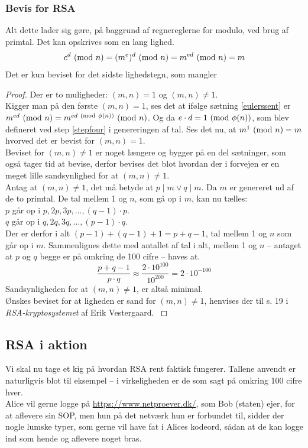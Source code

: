 \subsubsection{Bevis for RSA}
Alt dette lader sig gøre, på baggrund af regnereglerne for modulo, ved brug af primtal.
Det kan opskrives som en lang lighed.
\[c^d \ (\mathrm{mod}\ n) = (m^e)^d \ (\mathrm{mod}\ n) = m^{ed} \ (\mathrm{mod}\ n) = m\]
Det er kun beviset for det sidste lighedstegn, som mangler
\begin{proof}
        Der er to muligheder: \((m, n) = 1\) og \((m, n) \neq 1\).\\
        Kigger man på den første \((m, n) = 1\), ses det at ifølge sætning \ref{eulerssent} er \(m^{ed} \ (\mathrm{mod}\ n) = m^{ed \ (\mathrm{mod}\ \phi(n))} \ (\mathrm{mod}\ n)\).
        Og da \(e \cdot d = 1 \ (\mathrm{mod}\ \phi(n))\), som blev defineret ved step \ref{stepfour} i genereringen af tal.
        Ses det nu, at \(m^1 \ (\mathrm{mod}\ n) = m\) hvorved det er bevist for \((m, n) = 1\).\\
        Beviset for \((m, n) \neq 1\) er noget længere og bygger på en del sætninger, som også tager tid at bevise, derfor bevises det blot hvordan der i forvejen er en meget lille sandsynlighed for at \((m, n) \neq 1\).\\
        Antag at \((m, n) \neq 1\), det må betyde at \(p \mid m \lor q \mid m\). Da \(m\) er genereret ud af de to primtal.
        De tal mellem 1 og \(n\), som gå op i \(m\), kan nu tælles:\\
        \(p\) går op i \(p, 2p, 3p, \hdots , (q - 1) \cdot p\).\\
        \(q\) går op i \(q, 2q, 3q, \hdots , (p - 1) \cdot q\).\\
        Der er derfor i alt \((p - 1) + (q - 1) + 1 = p + q - 1\), tal mellem 1 og \(n\) som går op i \(m\).
        Sammenlignes dette med antallet af tal i alt, mellem 1 og \(n\) -- antaget at \(p\) og \(q\) begge er på omkring de 100 cifre -- haves at.
        \[\frac{p + q - 1}{p \cdot q} \approx \frac{2 \cdot 10^{100}}{10^{200}} = 2 \cdot 10^{-100}\]
        Sandsynligheden for at \((m, n) \neq 1\), er altså minimal.\\
        Ønskes beviset for at ligheden er sand for \((m, n) \neq 1\), henvises der til s. 19 i \textit{RSA-kryptosystemet} af Erik Vestergaard. \cite[19]{vestergaard}
\end{proof}



\subsection{RSA i aktion}
Vi skal nu tage et kig på hvordan RSA rent faktisk fungerer.
Tallene anvendt er naturligvis blot til eksempel -- i virkeligheden er de som sagt på omkring 100 cifre hver.\\
Alice vil gerne logge på \url{https://www.netproever.dk/}, som Bob (staten) ejer, for at aflevere sin SOP, men hun på det netværk hun er forbundet til, sidder der nogle lumske typer, som gerne vil have fat i Alices kodeord, sådan at de kan logge ind som hende og aflevere noget bras.

